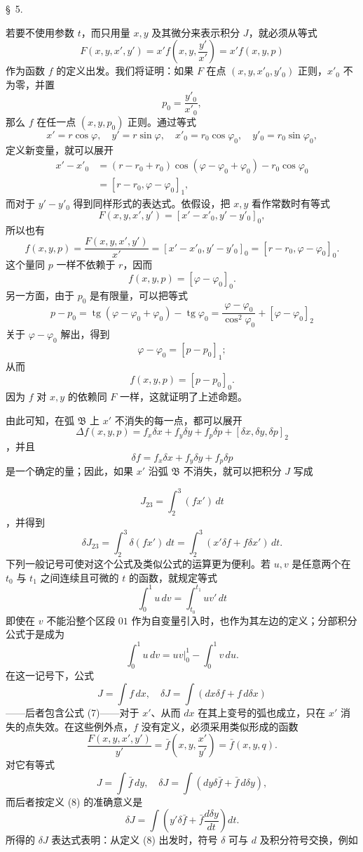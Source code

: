 \documentclass[11pt,a4paper,leqno]{article}
\begin{document}
\begin{center}
\S~5.
\end{center}

若要不使用参数 \(t\)，而只用量 \(x,y\) 及其微分来表示积分 \(J\)，就必须从等式
\[
F(x,y,x',y')=x'f\left(x,y,\frac{y'}{x'}\right)=x'f(x,y,p)
\]
作为函数 \(f\) 的定义出发。我们将证明：如果 \(F\) 在点 \((x,y,x'_0,y'_0)\) 正则，\(x'_0\) 不为零，并置
\[
p_0=\frac{y'_0}{x'_0},
\]
那么 \(f\) 在任一点 \((x,y,p_0)\) 正则。通过等式
\[
x'=r\cos\varphi,\quad y'=r\sin\varphi,\quad x'_0=r_0\cos\varphi_0,\quad y'_0=r_0\sin\varphi_0,
\]
定义新变量，就可以展开
\[
\begin{aligned}
x'-x'_0&=(r-r_0+r_0)\cos(\varphi-\varphi_0+\varphi_0)-r_0\cos\varphi_0\\
&=[r-r_0,\varphi-\varphi_0]_1,
\end{aligned}
\]
而对于 \(y'-y'_0\) 得到同样形式的表达式。依假设，把 \(x,y\) 看作常数时有等式
\[
F(x,y,x',y')=[x'-x'_0,y'-y'_0]_0,
\]
所以也有
\[
f(x,y,p)=\frac{F(x,y,x',y')}{x'}=[x'-x'_0,y'-y'_0]_0=[r-r_0,\varphi-\varphi_0]_0.
\]
这个量同 \(p\) 一样不依赖于 \(r\)，因而
\[
f(x,y,p)=[\varphi-\varphi_0]_0.
\]
另一方面，由于 \(p_0\) 是有限量，可以把等式
\[
p-p_0=\operatorname{tg}(\varphi-\varphi_0+\varphi_0)-\operatorname{tg}\varphi_0
=\frac{\varphi-\varphi_0}{\cos^2\varphi_0}+[\varphi-\varphi_0]_2
\]
关于 \(\varphi-\varphi_0\) 解出，得到
\[
\varphi-\varphi_0=[p-p_0]_1;
\]
从而
\[
f(x,y,p)=[p-p_0]_0.
\]
因为 \(f\) 对 \(x,y\) 的依赖同 \(F\) 一样，这就证明了上述命题。

由此可知，在弧 \(\mathfrak B\) 上 $x'$ 不消失的每一点，都可以展开
\[
\Delta f(x,y,p)=f_x\delta x+f_y\delta y+f_p\delta p+[\delta x,\delta y,\delta p]_2
\]
，并且
\[
\delta f=f_x\delta x+f_y\delta y+f_p\delta p
\]
是一个确定的量；因此，如果 $x'$ 沿弧 \(\mathfrak B\) 不消失，就可以把积分 \(J\) 写成

\[
J_{23}=\int_2^3(fx')\,dt
\]
，并得到
\[
\tag{7}
\delta J_{23}=\int_2^3\delta(fx')\,dt=\int_2^3(x'\delta f+f\delta x')\,dt.
\]
下列一般记号可使对这个公式及类似公式的运算更为便利。若 \(u,v\) 是任意两个在 $t_0$ 与 $t_1$ 之间连续且可微的 $t$ 的函数，就规定等式
\[
\tag{8}
\int_0^1u\,dv=\int_{t_0}^{t_1}uv'\,dt
\]
即使在 \(v\) 不能沿整个区段 $01$ 作为自变量引入时，也作为其左边的定义；分部积分公式于是成为
\[
\int_0^1u\,dv=uv\bigg|_0^1-\int_0^1v\,du.
\]
在这一记号下，公式
\[
J=\int f\,dx,\quad \delta J=\int(dx\delta f+f\,d\delta x)
\]
——后者包含公式 (7)——对于 $x'$、从而 $dx$ 在其上变号的弧也成立，只在 $x'$ 消失的点失效。在这些例外点，$f$ 没有定义，必须采用类似形成的函数
\[
\frac{F(x,y,x',y')}{y'}=\bar f\left(x,y,\frac{x'}{y'}\right)=\bar f(x,y,q).
\]
对它有等式
\[
J=\int \bar f\,dy,\quad \delta J=\int(dy\delta\bar f+\bar f\,d\delta y),
\]
而后者按定义 (8) 的准确意义是
\[
\delta J=\int\left(y'\delta\bar f+\bar f\frac{d\delta y}{dt}\right)dt.
\]
所得的 \(\delta J\) 表达式表明：从定义 (8) 出发时，符号 \(\delta\) 可与 \(d\) 及积分符号交换，例如
\end{document}
